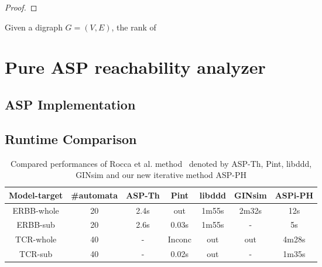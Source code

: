 \begin{theorem}\label{th:underapprox}
    \begin{proof}
    \end{proof}
\end{theorem}

\begin{definition}\label{def:rank}
Given a digraph $G=(V,E)$, the rank of 

\end{definition}


\chapter{Pure ASP reachability analyzer}
\section{ASP Implementation}
\section{Runtime Comparison}
\cite{abdallah2015exhaustive}
\begin{table}[ht]
    \centering
    \footnotesize
    \begin{tabular}{c|c|c|c|c|c|c}
        Model-target & \#automata & ASP-Th & Pint & libddd & GINsim & ASPi-PH\\
        \hline
        ERBB-whole & 20& 2.4s& out& 1m55s& 2m32s& 12s\\
        \hline
        ERBB-sub& 20& 2.6s& 0.03s& 1m55s& -& 5s\\
        \hline
        TCR-whole& 40& - &Inconc& out& out& 4m28s\\
        \hline
        TCR-sub& 40 &- &0.02s& out& -& 1m35s
    \end{tabular}
    \caption[Performance of pure ASP method]{Compared performances of Rocca et al. method~\cite{rocca2014asp} denoted by ASP-Th, Pint, libddd, GINsim and our new iterative method ASP-PH}
    \label{tab:pureAsp}
\end{table}